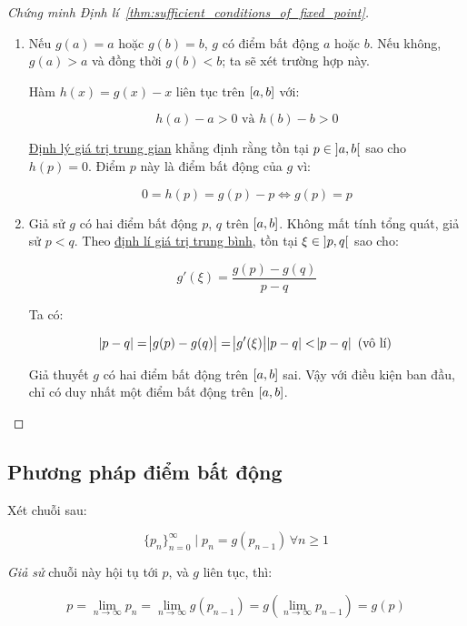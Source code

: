 \documentclass[../../Lectures.tex]{subfiles}
\begin{document}
\begin{proof}[Chứng minh Định lí~\ref{thm:sufficient_conditions_of_fixed_point}]
\phantom\\
\begin{enumerate}
    \item Nếu \(g(a) = a\) hoặc \(g(b) = b\), \(g\) có điểm bất động \(a\) hoặc
        \(b\). Nếu không, \(g(a) > a\) và đồng thời \(g(b) < b\); ta sẽ xét
        trường hợp này.

        Hàm \(h(x) = g(x) - x\) liên tục trên \(\interval{a}{b}\) với:

        \[h(a) - a > 0 \text{ và } h(b) - b > 0\]

        \hyperref[thm:intermediate_value_theorem]{Định lý giá trị trung gian}
        khẳng định rằng tồn tại \(p \in \interval[open]{a}{b}\) sao cho \(h(p) =
        0\). Điểm \(p\) này là điểm bất động của \(g\) vì:

        \[0 = h(p) = g(p) - p \iff g(p) = p\]

    \item Giả sử \(g\) có hai điểm bất động \(p\), \(q\) trên
        \(\interval{a}{b}\). Không mất tính tổng quát, giả sử \(p < q\). Theo
        \hyperref[thm:mean_value_theorem]{định lí giá trị trung bình}, tồn tại
        \(\xi \in \interval[open]{p}{q}\) sao cho:

        \[g'(\xi) = \frac{g(p) - g(q)}{p - q}\]

        Ta có:

        \[\abs{p - q} = \abs{g(p) - g(q)} = \abs{g'(\xi)} \abs{p - q} < \abs{p - q} \text{ (vô lí)}\]

        Giả thuyết \(g\) có hai điểm bất động trên \(\interval{a}{b}\) sai. Vậy
        với điều kiện ban đầu, chỉ có duy nhất một điểm bất động trên
        \(\interval{a}{b}\).
\end{enumerate}
\end{proof}

\subsection{Phương pháp điểm bất động}

Xét chuỗi sau:

\[\{p_n\}_{n=0}^\infty \mid p_n = g(p_{n-1}) \, \forall n \geq 1\]

\emph{Giả sử} chuỗi này hội tụ tới \(p\), và \(g\) liên tục, thì:

\[p = \lim_{n \to \infty} p_n = \lim_{n \to \infty} g(p_{n - 1}) = g(\lim_{n \to \infty} p_{n - 1}) = g(p)\]
\end{document}

